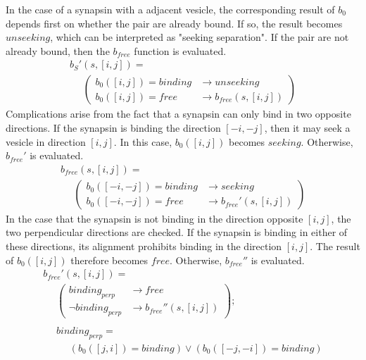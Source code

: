 \documentclass{acm_proc_article-sp}
\begin{document}
In the case of a synapsin with a adjacent vesicle, the corresponding
result of $b_0$ depends first on whether the pair are already
bound.  If so, the result becomes $unseeking$, which can be
interpreted as "seeking separation".  If the pair are not already
bound, then the $b_{free}$ function is evaluated.
\begin{displaymath} \begin{array}{l}
b_S'(s, [i, j]) = \\
\hspace{16pt} \left( \begin{array}{ll} b_0([i, j]) = binding & \rightarrow unseeking \\
                                       b_0([i, j]) = free    & \rightarrow b_{free}(s, [i, j]) \end{array} \right)
\end{array} \end{displaymath}
Complications arise from the fact that a synapsin can only bind
in two opposite directions.  If the synapsin is binding the 
direction $[-i, -j]$, then it may seek a vesicle in direction $[i, j]$.
In this case, $b_0([i, j])$ becomes $seeking$.  Otherwise,
$b_{free}'$ is evaluated.
\begin{displaymath} \begin{array}{l}
b_{free}(s, [i, j]) = \\
\hspace{16pt} \left( \begin{array}{ll} b_0([-i, -j]) = binding & \rightarrow seeking \\
                                       b_0([-i, -j]) = free    & \rightarrow b_{free}'(s, [i, j]) \end{array} \right)
\end{array} \end{displaymath}
In the case that the synapsin is not binding in the direction opposite 
$[i, j]$, the two perpendicular directions are checked.  If the
synapsin is binding in either of these directions, its alignment
prohibits binding in the direction $[i, j]$.  The result of 
$b_0([i, j])$ therefore becomes $free$.  Otherwise,
$b_{free}''$ is evaluated.
\begin{displaymath} \begin{array}{l}
b_{free}'(s, [i, j]) = \\
\hspace{16pt} \left( \begin{array}{ll} binding_{perp}      & \rightarrow free \\
                                       \neg binding_{perp} & \rightarrow b_{free}''(s, [i, j]) \end{array} \right); \\
\\
\hspace{16pt} binding_{perp} = \\
\hspace{16pt} \hspace{16pt} (b_0([j, i]) = binding) \vee (b_0([-j, -i]) = binding)
\end{array} \end{displaymath}
\end{document}
